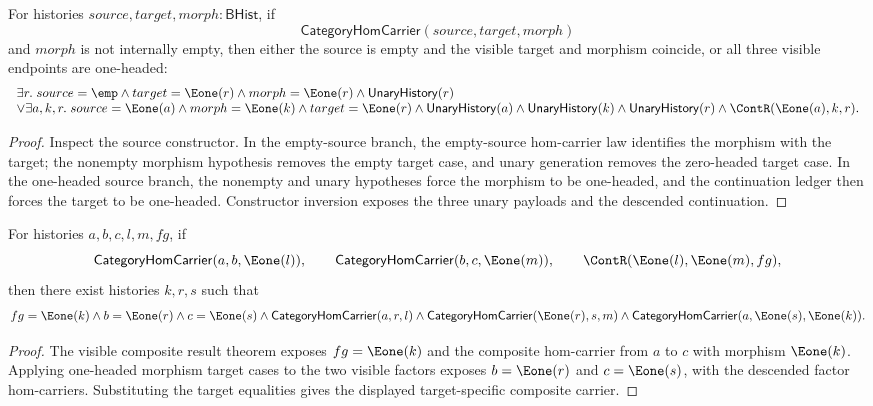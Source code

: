 \begin{theorem}
\label{thm:category-hom-carrier-nonempty-morphism-visible-endpoint-cases}
For histories $source,target,morph:\mathsf{BHist}$, if
$$
\mathsf{CategoryHomCarrier}(source,target,morph)
$$
and $morph$ is not internally empty, then either the source is empty and the
visible target and morphism coincide, or all three visible endpoints are
one-headed:
$$
\begin{array}{l}
\exists r.\;source=\emp\land target=\Eone(r)\land morph=\Eone(r)\land
\mathsf{UnaryHistory}(r)
\\
\vee
\exists a,k,r.\;source=\Eone(a)\land morph=\Eone(k)\land target=\Eone(r)\land
\mathsf{UnaryHistory}(a)\land\mathsf{UnaryHistory}(k)\land
\mathsf{UnaryHistory}(r)\land\ContR(\Eone(a),k,r).
\end{array}
$$
\end{theorem}
\begin{proof}
Inspect the source constructor. In the empty-source branch, the empty-source
hom-carrier law identifies the morphism with the target; the nonempty morphism
hypothesis removes the empty target case, and unary generation removes the
zero-headed target case. In the one-headed source branch, the nonempty and
unary hypotheses force the morphism to be one-headed, and the continuation
ledger then forces the target to be one-headed. Constructor inversion exposes
the three unary payloads and the descended continuation.
\end{proof}

\begin{theorem}
\label{thm:category-visible-composite-result-target-cases}
For histories $a,b,c,l,m,fg$, if
$$
\mathsf{CategoryHomCarrier}(a,b,\Eone(l)),\qquad
\mathsf{CategoryHomCarrier}(b,c,\Eone(m)),\qquad
\ContR(\Eone(l),\Eone(m),fg),
$$
then there exist histories $k,r,s$ such that
$$
\begin{aligned}
fg=\Eone(k)\land b=\Eone(r)\land c=\Eone(s)\land
\mathsf{CategoryHomCarrier}(a,r,l)\land
\mathsf{CategoryHomCarrier}(\Eone(r),s,m)\land
\mathsf{CategoryHomCarrier}(a,\Eone(s),\Eone(k)).
\end{aligned}
$$
\end{theorem}
\begin{proof}
The visible composite result theorem exposes $fg=\Eone(k)$ and the composite
hom-carrier from $a$ to $c$ with morphism $\Eone(k)$. Applying one-headed
morphism target cases to the two visible factors exposes $b=\Eone(r)$ and
$c=\Eone(s)$, with the descended factor hom-carriers. Substituting the target
equalities gives the displayed target-specific composite carrier.
\end{proof}

